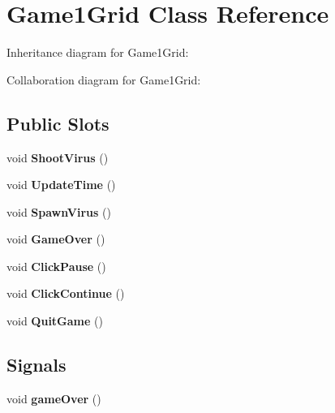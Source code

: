 \hypertarget{classGame1Grid}{}\section{Game1\+Grid Class Reference}
\label{classGame1Grid}


Inheritance diagram for Game1\+Grid\+:


Collaboration diagram for Game1\+Grid\+:
\subsection*{Public Slots}
\begin{DoxyCompactItemize}
\item 
\mbox{\label{classGame1Grid_af541011eb2e1168669dde5b9cdd29a77}} 
void {\bfseries Shoot\+Virus} ()
\item 
\mbox{\label{classGame1Grid_a7741eac6d405319474e22549b2e5a727}} 
void {\bfseries Update\+Time} ()
\item 
\mbox{\label{classGame1Grid_a8ae09d14f2ffbcf3fa65f917ade6fb8d}} 
void {\bfseries Spawn\+Virus} ()
\item 
\mbox{\label{classGame1Grid_a501210aa672a1e7593cb9be3ff238464}} 
void {\bfseries Game\+Over} ()
\item 
\mbox{\label{classGame1Grid_a9a6e5239a1b09f3f758503c24766583f}} 
void {\bfseries Click\+Pause} ()
\item 
\mbox{\label{classGame1Grid_a82311dcf0ee4d0c41b413e4eb622a695}} 
void {\bfseries Click\+Continue} ()
\item 
\mbox{\label{classGame1Grid_acb3fadeeb20d1d8b74ab820745c06551}} 
void {\bfseries Quit\+Game} ()
\end{DoxyCompactItemize}
\subsection*{Signals}
\begin{DoxyCompactItemize}
\item 
\mbox{\label{classGame1Grid_ae12a5e01c80683d7d8f3187d8b560a8c}} 
void {\bfseries game\+Over} ()
\end{DoxyCompactItemize}

